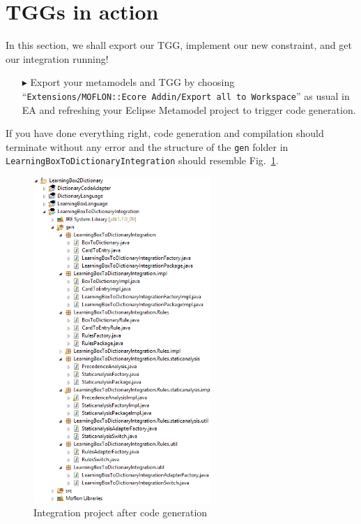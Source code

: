 \section{TGGs in action}
\label{sect:TGGs_in_Action}
In this section, we shall export our TGG, implement our new constraint, and get our integration running!

\begin{enumerate}
\item[$\blacktriangleright$] Export your metamodels and TGG by choosing ``\texttt{Extensions/\-MOFLON::\-Ecore Addin\-/Export all to Workspace}'' as usual in EA and refreshing your Eclipse Metamodel project to trigger code generation.
\end{enumerate}

If you have done everything right, code generation and compilation should terminate without any error and the structure of the \texttt{gen} folder in \texttt{LearningBox\-To\-Dictionary\-Integration} should resemble Fig.~\ref{fig:gen_folder}.

\begin{figure}[htbp]
\begin{center}
  \includegraphics[width=0.6\textwidth]{pics/tggBilder/transformation/tgg22}
  \caption{Integration project after code generation}
  \label{fig:gen_folder}
\end{center}
\end{figure}

